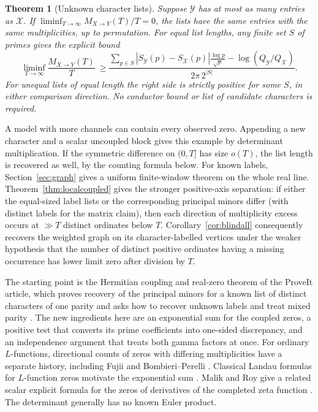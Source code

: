 \documentclass[11pt]{article}
\newtheorem{theorem}{Theorem}[section]
\newcommand{\cX}{\mathcal X}
\newcommand{\cY}{\mathcal Y}
\begin{document}
\begin{theorem}[Unknown character lists]\label{main}
Suppose $\cY$ has at most as many entries as $\cX$.
If $\liminf_{T\to\infty}M_{X\to Y}(T)/T=0$, the lists have the same entries with the same multiplicities, up to permutation. For equal list lengths, any finite set $S$ of primes gives the explicit bound
\begin{equation}\label{witness}
 \liminf_{T\to\infty}\frac{M_{X\to Y}(T)}{T}\ \ge \frac{\displaystyle\sum_{p\in S}|S_{\cY}(p)-S_{\cX}(p)|
                    \frac{\log p}{\sqrt p}-\log(Q_{\cY}/Q_{\cX})}
      {2\pi\,2^{|S|}} .
\end{equation}
For unequal lists of equal length the right side is strictly positive for some $S$, in either comparison direction. No conductor bound or list of candidate characters is required.
\end{theorem}

A model with more channels can contain every observed zero. Appending a new character and a scalar uncoupled block gives this example by determinant multiplication. If the symmetric difference on $(0,T]$ has size $o(T)$, the list length is recovered as well, by the counting formula below. For known labels, Section~\ref{sec:graph} gives a uniform finite-window theorem on the whole real line. Theorem~\ref{thm:localcoupled} gives the stronger positive-axis separation: if either the equal-sized label lists or the corresponding principal minors differ (with distinct labels for the matrix claim), then each direction of multiplicity excess occurs at $\gg T$ distinct ordinates below $T$. Corollary~\ref{cor:blindall} consequently recovers the weighted graph on its character-labelled vertices under the weaker hypothesis that the number of distinct positive ordinates having a missing occurrence has lower limit zero after division by $T$.

The starting point is the Hermitian coupling and real-zero theorem of the ProveIt article, which proves recovery of the principal minors for a known list of distinct characters of one parity and asks how to recover unknown labels and treat mixed parity \cite{repo}. The new ingredients here are an exponential sum for the coupled zeros, a positive test that converts its prime coefficients into one-sided discrepancy, and an independence argument that treats both gamma factors at once. For ordinary $L$-functions, directional counts of zeros with differing multiplicities have a separate history, including Fujii and Bombieri--Perelli \cite{fujii,bp}. Classical Landau formulas for $L$-function zeros motivate the exponential sum \cite{landau,landau2,hyder}. Malik and Roy give a related scalar explicit formula for the zeros of derivatives of the completed zeta function \cite{mr}. The determinant generally has no known Euler product.
\end{document}
